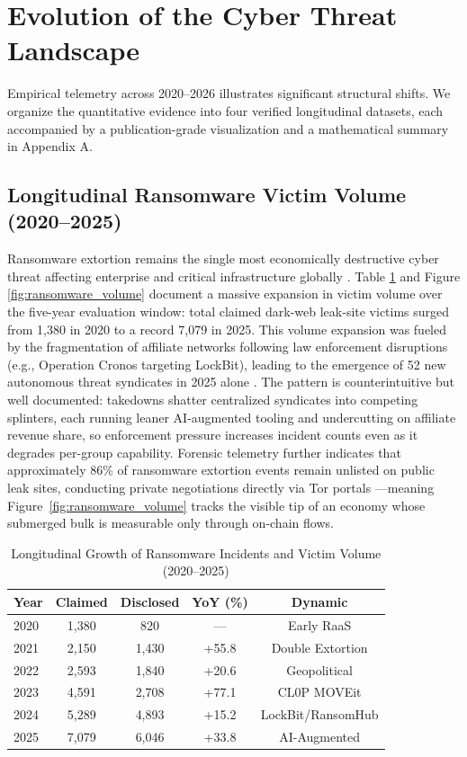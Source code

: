 \documentclass[conference,10pt,twocolumn,a4paper]{IEEEtran}
\begin{document}
\section{Evolution of the Cyber Threat Landscape}
\label{sec:threat}
Empirical telemetry across 2020--2026 illustrates significant structural shifts. We organize the quantitative evidence into four verified longitudinal datasets, each accompanied by a publication-grade visualization and a mathematical summary in Appendix A.

\subsection{Longitudinal Ransomware Victim Volume (2020--2025)}
Ransomware extortion remains the single most economically destructive cyber threat affecting enterprise and critical infrastructure globally \cite{blackkite_ransomware_2025, chainalysis_crypto_crime_2026}. Table \ref{tab:ransom_volume} and Figure \ref{fig:ransomware_volume} document a massive expansion in victim volume over the five-year evaluation window: total claimed dark-web leak-site victims surged from 1,380 in 2020 to a record 7,079 in 2025. This volume expansion was fueled by the fragmentation of affiliate networks following law enforcement disruptions (e.g., Operation Cronos targeting LockBit), leading to the emergence of 52 new autonomous threat syndicates in 2025 alone \cite{blackkite_ransomware_2025}. The pattern is counterintuitive but well documented: takedowns shatter centralized syndicates into competing splinters, each running leaner AI-augmented tooling and undercutting on affiliate revenue share, so enforcement pressure increases incident counts even as it degrades per-group capability. Forensic telemetry further indicates that approximately 86\% of ransomware extortion events remain unlisted on public leak sites, conducting private negotiations directly via Tor portals \cite{chainalysis_crypto_crime_2026}---meaning Figure~\ref{fig:ransomware_volume} tracks the visible tip of an economy whose submerged bulk is measurable only through on-chain flows.

\begin{table}[t]
\caption{Longitudinal Growth of Ransomware Incidents and Victim Volume (2020--2025)}
\label{tab:ransom_volume}
\centering
\footnotesize
\begin{tabular}{lcccc}
\toprule
Year & Claimed & Disclosed & YoY (\%) & Dynamic \\
\midrule
2020 & 1,380 & 820 & --- & Early RaaS \\
2021 & 2,150 & 1,430 & +55.8 & Double Extortion \\
2022 & 2,593 & 1,840 & +20.6 & Geopolitical \\
2023 & 4,591 & 2,708 & +77.1 & CL0P MOVEit \\
2024 & 5,289 & 4,893 & +15.2 & LockBit/RansomHub \\
2025 & 7,079 & 6,046 & +33.8 & AI-Augmented \\
\bottomrule
\end{tabular}
\end{table}
\end{document}
